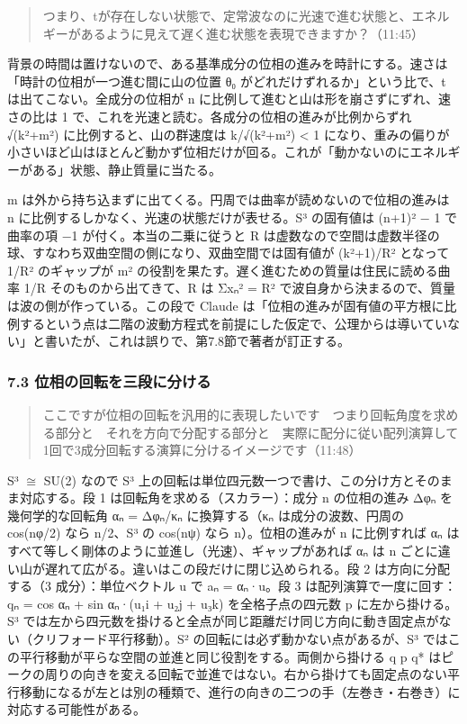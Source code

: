 \documentclass[
  a4paper,
]{ltjsarticle}
\begin{document}
\begin{quote}
つまり、tが存在しない状態で、定常波なのに光速で進む状態と、エネルギーがあるように見えて遅く進む状態を表現できますか？（11:45）
\end{quote}

背景の時間は置けないので、ある基準成分の位相の進みを時計にする。速さは「時計の位相が一つ進む間に山の位置
θ₀ がどれだけずれるか」という比で、t は出てこない。全成分の位相が n
に比例して進むと山は形を崩さずにずれ、速さの比は 1
で、これを光速と読む。各成分の位相の進みが比例からずれ √(k²+m²)
に比例すると、山の群速度は k/√(k²+m²) \textless{} 1
になり、重みの偏りが小さいほど山はほとんど動かず位相だけが回る。これが「動かないのにエネルギーがある」状態、静止質量に当たる。

m は外から持ち込まずに出てくる。円周では曲率が読めないので位相の進みは n
に比例するしかなく、光速の状態だけが表せる。S³ の固有値は (n+1)² − 1
で曲率の項 −1 が付く。本当の二乗に従うと R
は虚数なので空間は虚数半径の球、すなわち双曲空間の側になり、双曲空間では固有値が
(k²+1)/\textbar R\textbar² となって 1/\textbar R\textbar² のギャップが
m² の役割を果たす。遅く進むための質量は住民に読める曲率
1/\textbar R\textbar{} そのものから出てきて、R は Σxₙ² = R²
で波自身から決まるので、質量は波の側が作っている。この段で Claude
は「位相の進みが固有値の平方根に比例するという点は二階の波動方程式を前提にした仮定で、公理からは導いていない」と書いたが、これは誤りで、第7.8節で著者が訂正する。

\subsubsection{7.3
位相の回転を三段に分ける}\label{ux4f4dux76f8ux306eux56deux8ee2ux3092ux4e09ux6bb5ux306bux5206ux3051ux308b}

\begin{quote}
ここですが位相の回転を汎用的に表現したいです　つまり回転角度を求める部分と　それを方向で分配する部分と　実際に配分に従い配列演算して1回で3成分回転する演算に分けるイメージです（11:48）
\end{quote}

S³ \(\cong\) SU(2) なので S³
上の回転は単位四元数一つで書け、この分け方とそのまま対応する。段 1
は回転角を求める（スカラー）：成分 n の位相の進み Δφₙ を幾何学的な回転角
αₙ = Δφₙ/κₙ に換算する（κₙ は成分の波数、円周の cos(nφ/2) なら n/2、S³
の cos(nψ) なら n）。位相の進みが n に比例すれば αₙ
はすべて等しく剛体のように並進し（光速）、ギャップがあれば αₙ は n
ごとに違い山が遅れて広がる。違いはこの段だけに閉じ込められる。段 2
は方向に分配する（3 成分）：単位ベクトル u で aₙ = αₙ·u。段 3
は配列演算で一度に回す：qₙ = cos αₙ + sin αₙ·(u₁i + u₂j + u₃k)
を全格子点の四元数 p に左から掛ける。S³
では左から四元数を掛けると全点が同じ距離だけ同じ方向に動き固定点がない（クリフォード平行移動）。S²
の回転には必ず動かない点があるが、S³
ではこの平行移動が平らな空間の並進と同じ役割をする。両側から掛ける q p
q*
はピークの周りの向きを変える回転で並進ではない。右から掛けても固定点のない平行移動になるが左とは別の種類で、進行の向きの二つの手（左巻き・右巻き）に対応する可能性がある。
\end{document}
